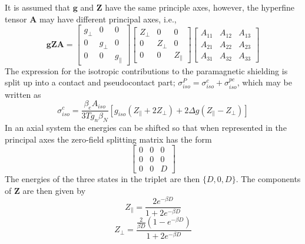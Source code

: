 \documentclass[12pt]{article}
\begin{document}
\noindent It is assumed that $\mathbf{g}$ and $\mathbf{Z}$ have the same principle axes, however, the hyperfine tensor $\mathbf{A}$
may have different principal axes, i.e.,
\begin{equation}
\mathbf{g}\mathbf{Z}\mathbf{A} = 
\begin{bmatrix}
g_{\perp} & 0          & 0 \\
0         & g_{\perp}  & 0 \\
0         & 0          & g_{\parallel} 
\end{bmatrix}
\begin{bmatrix}
Z_{\perp} & 0          & 0 \\
0         & Z_{\perp}  & 0 \\
0         & 0          & Z_{\parallel} 
\end{bmatrix}
\begin{bmatrix}
A_{11} & A_{12}  & A_{13} \\
A_{21} & A_{22}  & A_{23} \\
A_{31} & A_{32}  & A_{33} 
\end{bmatrix}
\end{equation}
The expression for the isotropic contributions to the paramagnetic shielding is split up into a contact and pseudocontact part; 
$\sigma_{iso}^{P} = \sigma_{iso}^{c}+\sigma_{iso}^{pc}$, which may be written as 
\begin{equation}
\sigma_{iso}^{c} = \frac{\beta_{e}A_{iso}}{3 T g_{n} \beta_{N} }[g_{iso}(Z_{\parallel}+2Z_{\perp})+2\Delta g (Z_{\parallel}-Z_{\perp})]
\end{equation}
\noindent In an axial system the energies can be shifted so that when represented in the principal axes the zero-field splitting matrix has the form
\begin{equation}
\begin{bmatrix}
0 & 0  & 0 \\
0         & 0  & 0 \\
0         & 0  & D
\label{eqn:axiald}
\end{bmatrix}
\end{equation}
\noindent The energies of the three states in the triplet are then $\{D, 0, D\}$. The components of $\mathbf{Z}$ are then given by
\begin{equation}
Z_{\parallel} = \frac{2 e^{-\beta D}}{1+2e^{-\beta D}}
\label{eqn:zparalleltriplet}
\end{equation}
\begin{equation}
Z_{\perp} = \frac{\frac{2}{\beta D} (1-e^{-\beta D})}{1+2e^{-\beta D}}
\label{eqn:zperptriplet}
\end{equation}
\end{document}

